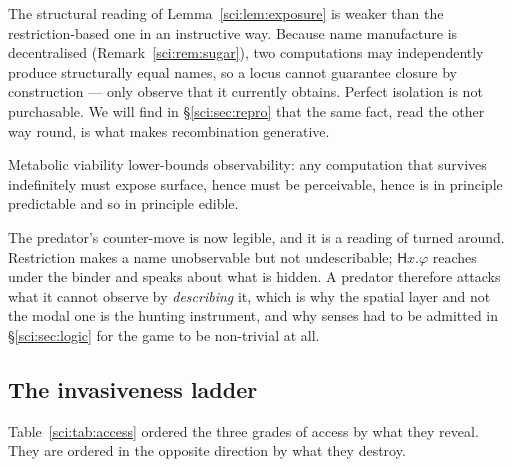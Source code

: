 \begin{remark}
\label{sci:rem:luck}
The structural reading of Lemma~\ref{sci:lem:exposure} is weaker than the restriction-based one in an
instructive way. Because name manufacture is decentralised (Remark~\ref{sci:rem:sugar}), two computations
may independently produce structurally equal names, so a locus cannot guarantee closure by
construction --- only observe that it currently obtains. Perfect isolation is not purchasable. We will
find in \S\ref{sci:sec:repro} that the same fact, read the other way round, is what makes recombination
generative.
\end{remark}

\begin{corollary}
\label{sci:cor:conceal}
Metabolic viability lower-bounds observability: any computation that survives indefinitely must expose
surface, hence must be perceivable, hence is in principle predictable and so in principle edible.
\end{corollary}

The predator's counter-move is now legible, and it is a reading of \cite[Rem.~2]{ClassifierNote}
turned around. Restriction makes a name unobservable but not undescribable; $\mathsf{H}x.\varphi$
reaches under the binder and speaks about what is hidden. A predator therefore attacks what it cannot
observe by \emph{describing} it, which is why the spatial layer and not the modal one is the hunting
instrument, and why senses had to be admitted in \S\ref{sci:sec:logic} for the game to be non-trivial at
all.

\subsection{The invasiveness ladder}\label{sci:S9.2}

Table~\ref{sci:tab:access} ordered the three grades of access by what they reveal. They are ordered in the
opposite direction by what they destroy.

\begin{table}[h]
\centering
{}
\caption{Information gain and subject survival are in strict opposition, and only the fatal end of the
ladder pays.}
\label{sci:tab:ladder}
\end{table}

